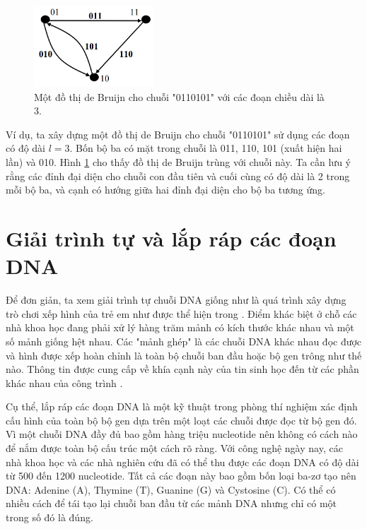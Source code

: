 \documentclass[14pt, a4paper]{article}
\numberwithin{equation}{section}
\numberwithin{figure}{section}
\numberwithin{dl}{section}
\numberwithin{md}{section}
\numberwithin{bd}{section}
\numberwithin{dn}{section}
\numberwithin{hq}{section}
\begin{document}
    \begin{figure}[h!]
        \centering
        \includegraphics[width=0.4\textwidth]{1.png}
        \caption{Một đồ thị de Bruijn cho chuỗi "0110101" với các đoạn chiều dài là 3.}
        \label{fig:1}
    \end{figure}

    Ví dụ, ta xây dựng một đồ thị de Bruijn cho chuỗi "0110101" sử dụng các đoạn có độ dài $l=3$.
    Bốn bộ ba có mặt trong chuỗi là 011, 110, 101 (xuất hiện hai lần) và 010.
    Hình \ref{fig:1} cho thấy đồ thị de Bruijn trùng với chuỗi này.
    Ta cần lưu ý rằng các đỉnh đại diện cho chuỗi con đầu tiên và cuối cùng có độ dài là 2 trong mỗi bộ ba, và cạnh có hướng giữa hai đỉnh đại diện cho bộ ba tương ứng.

    \section{Giải trình tự và lắp ráp các đoạn DNA}

    Để đơn giản, ta xem giải trình tự chuỗi DNA giống như là quá trình xây dựng trò chơi xếp hình của trẻ em như được thể hiện trong \cite{pevzner2001eulerian}.
    Điểm khác biệt ở chỗ các nhà khoa học đang phải xử lý hàng trăm mảnh có kích thước khác nhau và một số mảnh giống hệt nhau.
    Các "mảnh ghép" là các chuỗi DNA khác nhau đọc được và hình được xếp hoàn chỉnh là toàn bộ chuỗi ban đầu hoặc bộ gen trông như thế nào.
    Thông tin được cung cấp về khía cạnh này của tin sinh học đến từ các phần khác nhau của công trình \cite{jones2004introduction}.

    Cụ thể, lắp ráp các đoạn DNA là một kỹ thuật trong phòng thí nghiệm xác định cấu hình của toàn bộ bộ gen dựa trên một loạt các chuỗi được đọc từ bộ gen đó.
    Vì một chuỗi DNA đầy đủ bao gồm hàng triệu nucleotide nên không có cách nào để nắm được toàn bộ cấu trúc một cách rõ ràng.
    Với công nghệ ngày nay, các nhà khoa học và các nhà nghiên cứu đã có thể thu được các đoạn DNA có độ dài từ 500 đến 1200 nucleotide.
    Tất cả các đoạn này bao gồm bốn loại ba-zơ tạo nên DNA: Adenine (A), Thymine (T), Guanine (G) và Cystosine (C).
    Có thể có nhiều cách để tái tạo lại chuỗi ban đầu từ các mảnh DNA nhưng chỉ có một trong số đó là đúng.
\end{document}
